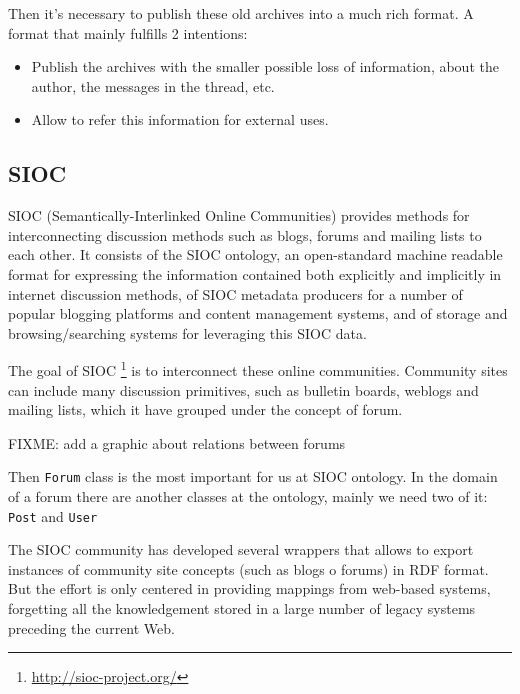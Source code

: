 \documentclass{llncs}
\begin{document}
Then it's necessary to publish these old archives into a much rich format\cite{Luke2004}.
A format that mainly fulfills 2 intentions:
\begin{itemize}
  \item Publish the archives with the smaller possible loss of information,
	about the author, the messages in the thread, etc.
  \item Allow to refer this information for external uses.
\end{itemize}

\subsection{SIOC}

SIOC (Semantically-Interlinked Online Communities) provides methods for 
interconnecting discussion methods such as blogs, forums and mailing lists 
to each other. It consists of the SIOC ontology, an open-standard machine 
readable format for expressing the information contained both explicitly 
and implicitly in internet discussion methods, of SIOC metadata producers 
for a number of popular blogging platforms and content management systems, 
and of storage and browsing/searching systems for leveraging this SIOC 
data. \cite{Breslin2005}

The goal of SIOC \footnote{\url{http://sioc-project.org/}} is to interconnect
these online communities. Community sites can include many discussion primitives,
such as bulletin boards, weblogs and mailing lists, which it have grouped under 
the concept of forum.


FIXME: add a graphic about relations between forums

Then \texttt{Forum} class is the most important for us at SIOC ontology. In the 
domain of a forum there are another classes at the ontology, mainly we need two
of it: \texttt{Post} and \texttt{User} 

The SIOC community has developed several wrappers that allows to export instances
of community site concepts (such as blogs o forums) in RDF format. But the effort 
is only centered in providing mappings from web-based systems, forgetting all the 
knowledgement stored in a large number of legacy systems preceding the current Web.
\end{document}

